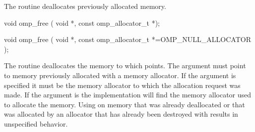 \begin{ccppspecific}
\summary
The  routine deallocates previously allocated memory.

\format

\begin{cspecific}
\begin{ompcFunction}
void omp_free ( void *, const omp_allocator_t *);
\end{ompcFunction}
\end{cspecific}
\begin{cppspecific}
\begin{ompcFunction}
void omp_free (
  void *,
  const omp_allocator_t *=OMP_NULL_ALLOCATOR
);
\end{ompcFunction}
\end{cppspecific}

\effect

The  routine deallocates the memory to which  points. The  argument must point to memory previously allocated with a memory allocator. If the  argument is specified it must be the memory allocator to which the allocation request was made. If the  argument is  the implementation will find the memory allocator used to allocate the memory. Using  on memory that was already deallocated or that was allocated by an allocator that has already been destroyed with  results in unspecified behavior.

\end{ccppspecific}
